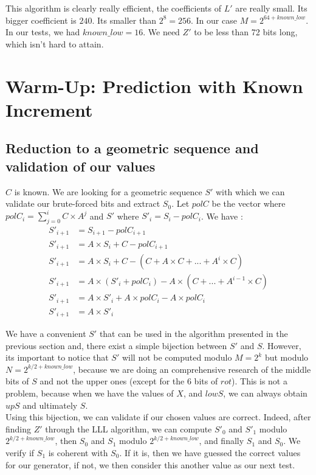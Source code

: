 \documentclass[preprint]{iacrtrans}
\begin{document}
This algorithm is clearly really efficient, the coefficients of $L'$ are really small. Its bigger coefficient is $240$. Its smaller than $2^8 = 256$. In our case $M = 2^{64 + known\_low}$. In our tests, we had $known\_low = 16$. We need $Z'$ to be less than 72 bits long, which isn't hard to attain.


\section{Warm-Up: Prediction with Known Increment }
\subsection{Reduction to a geometric sequence and validation of our values}

$C$ is known. We are looking for a geometric sequence $S'$ with which we can validate our brute-forced bits and extract $S_0$. Let $polC$ be the vector where $polC_i = \sum_{j=0}^{i} C \times A^j$ and $S'$ where $S'_i = S_i - polC_i$. We have :
\begin{align}
    S'_{i+1} &= S_{i+1} - polC_{i+1}\\
    S'_{i+1} &= A \times S_i + C - polC_{i+1}\\
    S'_{i+1} &= A \times S_i + C - (C + A \times C + ...+ A^{i} \times C)\\
    S'_{i+1} &= A \times (S'_i + polC_i) - A \times (C + ... + A^{i-1} \times C)\\
    S'_{i+1} &= A \times S'_i + A \times polC_i - A \times polC_i\\
    S'_{i+1} &= A \times S'_i
\end{align}

We have a convenient $S'$ that can be used in the algorithm presented in the previous section and, there exist a simple bijection between $S'$ and $S$. However, its important to notice that $S'$ will not be computed modulo $M = 2^k$ but modulo $N = 2^{k/2 + known\_low}$, because we are doing an comprehensive research of the middle bits of $S$ and not the upper ones (except for the 6 bits of $rot$). This is not a problem, because when we have the values of $X$, and $lowS$, we can always obtain $upS$ and ultimately $S$.\\



Using this bijection, we can validate if our chosen values are correct. Indeed, after finding $Z'$ through the LLL algorithm, we can compute $S'_0$ and $S'_1$ modulo $2^{k/2 + known\_low}$, then $S_0$ and $S_1$ modulo $2^{k/2 + known\_low}$, and finally $S_1$ and $S_0$. We verify if $S_1$ is coherent with $S_0$. If it is, then we have guessed the correct values for our generator, if not, we then consider this another value as our next test.
\end{document}
